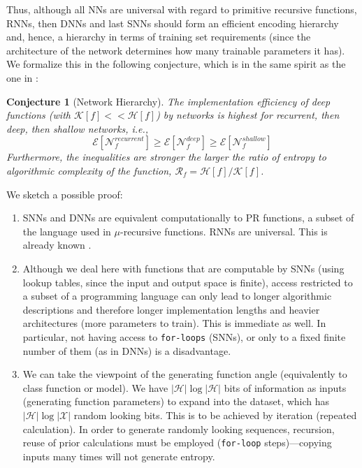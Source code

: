 \documentclass[11pt]{amsart}
\newcommand{\inputspace}{\mathcal X}
\newcommand{\handspace}{\mathcal H}
\newtheorem{conjecture}{Conjecture}
\begin{document}
Thus, although all NNs are universal with regard to primitive recursive functions, RNNs, then DNNs and last SNNs should form an efficient encoding hierarchy and, hence, a hierarchy in terms of training set requirements (since the architecture of the network determines how many  trainable parameters it has).
 We formalize this in the following conjecture, which is in the same spirit as the one in \cite{Mhaskar:2016aa}:


\begin{conjecture}[Network Hierarchy]
The implementation efficiency of deep functions (with $\mathcal K[f] <<  \handspace[f]$) by networks is highest for recurrent,  then  deep, then shallow networks, i.e., 
$$
\mathcal E[\mathcal N^{recurrent}_{f}]   \ge   \mathcal E[\mathcal N^{deep}_{f}]  \ge \mathcal E[\mathcal N^{shallow}_{f}] 
$$
Furthermore, the inequalities are stronger the larger the ratio of  entropy to algorithmic complexity of the function, $ \mathcal R_{f}=  \handspace[f] / \mathcal K[f] $.
\end{conjecture}

We sketch a possible  proof:
\begin{enumerate}
\item
SNNs and DNNs  are equivalent computationally to PR functions, a subset of the language used in $\mu$-recursive functions. RNNs are universal. This is already known \cite{Siegelmann:1995aa}. %
\item
Although we deal here with functions that are computable by SNNs (using lookup tables, since the input and output space is finite), access restricted to a subset of a programming language can only lead to longer algorithmic descriptions and therefore longer implementation lengths and heavier architectures (more parameters to train). This is immediate as well. In particular, not having access to {\tt for-loops} (SNNs), or only to a fixed finite number of them (as in DNNs) is a disadvantage.
\item We can take the viewpoint of the generating function angle (equivalently to class function or model). We have $|\handspace| \log |\handspace|$ bits of information as inputs (generating function parameters) to expand into the dataset, which has $|\handspace| \log |\inputspace|$ random looking bits. This is to be achieved by iteration (repeated calculation). In order to generate randomly looking sequences, recursion, reuse of prior calculations must be employed ({\tt for-loop} steps)---copying inputs many times will not generate entropy.
\end{enumerate}
\end{document}
